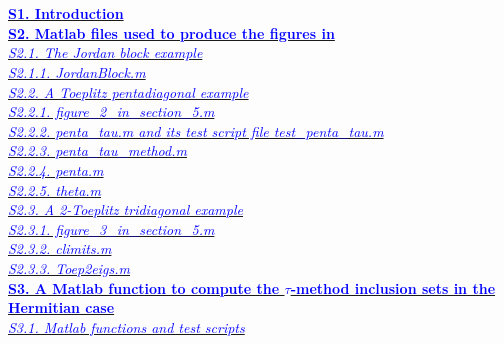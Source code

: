 \documentclass[preprint,1p,11pt]{elsarticle}
\newcommand{\bl}[1]{\textcolor{blue}{#1}}   %
\numberwithin{equation}{section}   %
\numberwithin{figure}{section}  %
\begin{document}
\\
\\
\hyperref[sec:intros]{\bf \bl{S1. Introduction}}\\
\hyperref[sec:script]{\bf \bl{S2. Matlab files used to produce the figures in \cite{CWL}}}\\
\hspace*{3ex} \hyperref[sec:Jordans]{\bl{\it S2.1. The Jordan block example}}\\
\hspace*{6ex} \hyperref[code:JB]{\bl{\it S2.1.1. JordanBlock.m}}\\
\hspace*{3ex} \hyperref[sec:penm]{\bl{\it S2.2. A Toeplitz pentadiagonal example}}\\
\hspace*{6ex} \hyperref[code:fig2]{\bl{\it S2.2.1. figure\_2\_in\_section\_5.m}}\\
\hspace*{6ex} \hyperref[code:pentau]{\bl{\it S2.2.2. penta\_tau.m and its test script file test\_penta\_tau.m}}\\
\hspace*{6ex} \hyperref[code:ptm]{\bl{\it S2.2.3. penta\_tau\_method.m}}\\
\hspace*{6ex} \hyperref[code:penta]{\bl{\it S2.2.4. penta.m}}\\
\hspace*{6ex} \hyperref[code:theta]{\bl{\it S2.2.5. theta.m}}\\
\hspace*{3ex} \hyperref[sec:Toep2]{\bl{\it S2.3. A 2-Toeplitz tridiagonal example}}\\
\hspace*{6ex} \hyperref[code:fig3]{\bl{\it S2.3.1. figure\_3\_in\_section\_5.m}}\\
\hspace*{6ex} \hyperref[code:climits]{\bl{\it S2.3.2. climits.m}}\\
\hspace*{6ex} \hyperref[code:Toep2e]{\bl{\it S2.3.3. Toep2eigs.m}}\\
\hyperref[sec:Herm]{\bf \bl{S3. A Matlab function to compute the $\tau$-method inclusion sets in the}}\\
\hspace*{4ex} \hyperref[sec:Herm]{\bf \bl{Hermitian case}}\\
\hspace*{3ex} \hyperref[sec:Mfts]{\bl{\it S3.1. Matlab functions and test scripts}}\\
\end{document}
